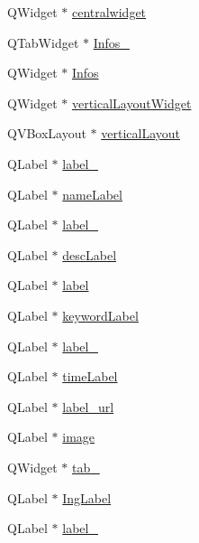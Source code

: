 \begin{DoxyCompactItemize}
\item 
Q\+Widget $\ast$ \hyperlink{classUi__MainWindow_a356f1cf3ebda15f1fac59467ee081b74}{centralwidget}
\item 
Q\+Tab\+Widget $\ast$ \hyperlink{classUi__MainWindow_ad29002426b14e983785a8f2886efbb5d}{Infos\+\_}
\item 
Q\+Widget $\ast$ \hyperlink{classUi__MainWindow_a21abb4cf009e45a4fc597be8e544db3c}{Infos}
\item 
Q\+Widget $\ast$ \hyperlink{classUi__MainWindow_a805d415fff07a22a85219e1f22f2da28}{vertical\+Layout\+Widget}
\item 
Q\+V\+Box\+Layout $\ast$ \hyperlink{classUi__MainWindow_aecd96a04789fcfec3f98d80390ad8184}{vertical\+Layout}
\item 
Q\+Label $\ast$ \hyperlink{classUi__MainWindow_a2e2516d755e4dd53fc905dabddf2738a}{label\+\_}
\item 
Q\+Label $\ast$ \hyperlink{classUi__MainWindow_a134047926bc9eaff33275117ccbc9c21}{name\+Label}
\item 
Q\+Label $\ast$ \hyperlink{classUi__MainWindow_a0376fd90247280e7c7957cc70628708c}{label\+\_}
\item 
Q\+Label $\ast$ \hyperlink{classUi__MainWindow_aef605882ad38f71df7095c44b3bb7a56}{desc\+Label}
\item 
Q\+Label $\ast$ \hyperlink{classUi__MainWindow_ad9c89133780f28e6efa2ec17ceb9cff5}{label}
\item 
Q\+Label $\ast$ \hyperlink{classUi__MainWindow_aeea47f27e4d1c1070f60af267ef06044}{keyword\+Label}
\item 
Q\+Label $\ast$ \hyperlink{classUi__MainWindow_ad6bab8fb8903b8f41afea1218ee52695}{label\+\_}
\item 
Q\+Label $\ast$ \hyperlink{classUi__MainWindow_a1c286339fffe4e58accecda69001e9f5}{time\+Label}
\item 
Q\+Label $\ast$ \hyperlink{classUi__MainWindow_a0946b5474fb7d431e2a4f148f0893d02}{label\+\_\+url}
\item 
Q\+Label $\ast$ \hyperlink{classUi__MainWindow_a2b36727ff7a03214bb218fcffc125854}{image}
\item 
Q\+Widget $\ast$ \hyperlink{classUi__MainWindow_a83495b23cbc6810f81978dc0d584b810}{tab\+\_}
\item 
Q\+Label $\ast$ \hyperlink{classUi__MainWindow_ac149af7acaa4ebc0f835b2d23c65d2c3}{Ing\+Label}
\item 
Q\+Label $\ast$ \hyperlink{classUi__MainWindow_a78c7e10730b43c6700cd7216911ed76a}{label\+\_}

\end{DoxyCompactItemize}

